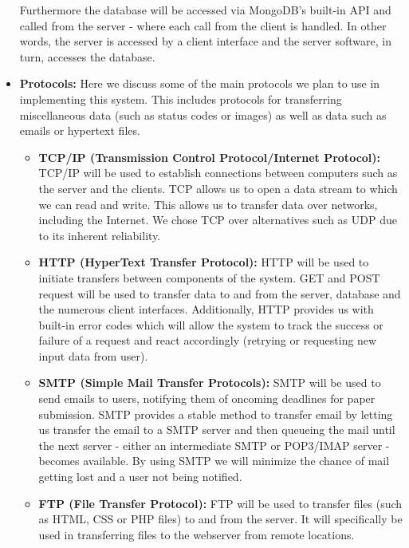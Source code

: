 \documentclass[a4paper,12pt]{article}
\begin{document}
\begin{itemize}
Furthermore the database will be accessed via MongoDB's built-in API and called from the server - where each call from the client is handled. In other words, the server is accessed by a client interface and the server software, in turn, accesses the database.

\item \textbf{Protocols:}
Here we discuss some of the main protocols we plan to use in implementing this system. This includes protocols for transferring miscellaneous data (such as status codes or images) as well as data such as emails or hypertext files.
\begin{itemize}
\item \textbf{TCP/IP (Transmission Control Protocol/Internet Protocol):}
TCP/IP will be used to establish connections between computers such as the server and the clients. TCP allows us to open a data stream to which we can read and write. This allows us to transfer data over networks, including the Internet. We chose TCP over alternatives such as UDP due to its inherent reliability.

\item \textbf{HTTP (HyperText Transfer Protocol):}
HTTP will be used to initiate transfers between components of the system. GET and POST request will be used to transfer data to and from the server, database and the numerous client interfaces. Additionally, HTTP provides us with built-in error codes which will allow the system to track the success or failure of a request and react accordingly (retrying or requesting new input data from user).

\item \textbf{SMTP (Simple Mail Transfer Protocols):}
SMTP will be used to send emails to users, notifying them of oncoming deadlines for paper submission. SMTP provides a stable method to transfer email by letting us transfer the email to a SMTP server and then queueing the mail until the next server - either an intermediate SMTP or POP3/IMAP server - becomes available. By using SMTP we will minimize the chance of mail getting lost and a user not being notified.

\item \textbf{FTP (File Transfer Protocol):}
FTP will be used to transfer files (such as HTML, CSS or PHP files) to and from the server. It will specifically be used in transferring files to the webserver from remote locations.


\end{itemize}

\end{itemize}
\end{document}
